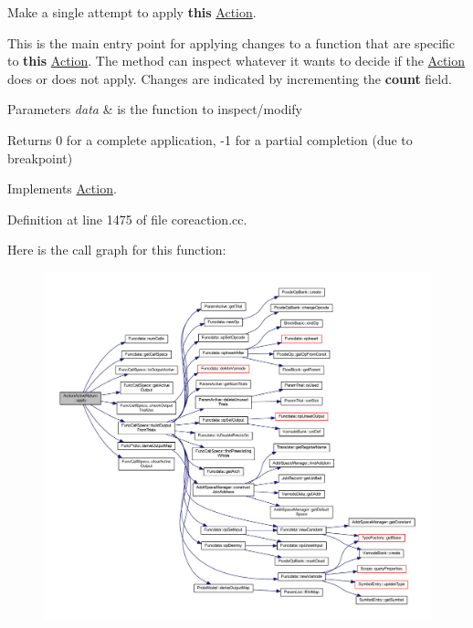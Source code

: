 Make a single attempt to apply {\bfseries{this}} \mbox{\hyperlink{class_action}{Action}}. 

This is the main entry point for applying changes to a function that are specific to {\bfseries{this}} \mbox{\hyperlink{class_action}{Action}}. The method can inspect whatever it wants to decide if the \mbox{\hyperlink{class_action}{Action}} does or does not apply. Changes are indicated by incrementing the {\bfseries{count}} field. 
\begin{DoxyParams}{Parameters}
{\em data} & is the function to inspect/modify \\
\hline
\end{DoxyParams}
\begin{DoxyReturn}{Returns}
0 for a complete application, -\/1 for a partial completion (due to breakpoint) 
\end{DoxyReturn}


Implements \mbox{\hyperlink{class_action_aac1c3999d6c685b15f5d9765a4d04173}{Action}}.



Definition at line 1475 of file coreaction.\+cc.

Here is the call graph for this function\+:
\nopagebreak
\begin{figure}[H]
\begin{center}
\leavevmode
\includegraphics[width=350pt]{class_action_active_return_a69af2f49b35ac17b7e2cab3e6c0be11b_cgraph}
\end{center}
\end{figure}
\mbox{\label{class_action_active_return_af22b0befcda10abe00618917a557f6c2}} 
